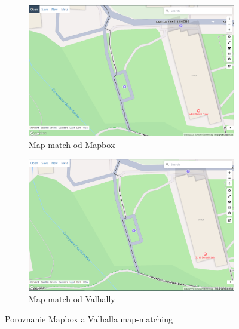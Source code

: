 \begin{figure}[H]
  \centering
  \begin{subfigure}{.45\textwidth}
    \centering
    \includegraphics[width=1\textwidth]{img/porovnanie_map_match/mapbox-map-match.png}
    \caption{Map-match od Mapbox}
    \label{fig:mapbox-map-match}
  \end{subfigure}
  \begin{subfigure}{.45\textwidth}
    \centering
    \includegraphics[width=1\textwidth]{img/porovnanie_map_match/valhalla-map-match.png}
    \caption{Map-match od Valhally}
    \label{fig:valhalla-map-match}
  \end{subfigure}
  \caption{Porovnanie Mapbox a Valhalla map-matching}
  \label{fig:mapbox-map-match-vs-valhalla}
\end{figure}

